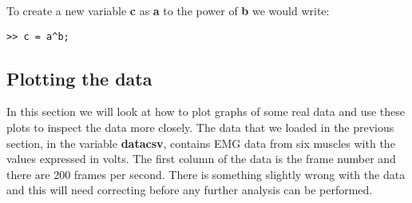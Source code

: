 \documentclass[12pt,a4paper]{article}
\begin{document}
To create a new variable \textbf{c} as \textbf{a} to the power of \textbf{b} we would write:
\begin{lstlisting}[style=Matlab-editor]
>> c = a^b;
\end{lstlisting}

\subsection{Plotting the data}
In this section we will look at how to plot graphs of some real data and use these plots to inspect the data more closely.  
The data that we loaded in the previous section, in the variable \textbf{datacsv}, contains EMG data from six muscles with the values expressed in volts.  
The first column of the data is the frame number and there are 200 frames per second.  
There is something slightly wrong with the data and this will need correcting before any further analysis can be performed.
\end{document}
